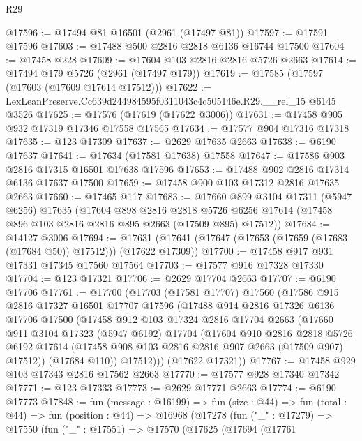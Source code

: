 \begin{lexlean}{R29}
\begin{coremodule}
@17596 := @17494 @81 @16501 (@2961 (@17497 @81))
@17597 := @17591 @17596
@17603 := @17488 @500 @2816 @2818 @6136 @16744 @17500
@17604 := @17458 @228
@17609 := @17604 @103 @2816 @2816 @5726 @2663
@17614 := @17494 @179 @5726 (@2961 (@17497 @179))
@17619 := @17585 (@17597 (@17603 (@17609 @17614 @17512)))
@17622 := LexLeanPreserve.Cc639d244984595f0311043c4c505146e.R29.__rel_15 @6145 @3526
@17625 := @17576 (@17619 (@17622 @3006))
@17631 := @17458 @905 @932 @17319 @17346 @17558 @17565
@17634 := @17577 @904 @17316 @17318
@17635 := @123 @17309
@17637 := @2629 @17635 @2663
@17638 := @6190 @17637
@17641 := @17634 (@17581 @17638) @17558
@17647 := @17586 @903 @2816 @17315 @16501 @17638 @17596
@17653 := @17488 @902 @2816 @17314 @6136 @17637 @17500
@17659 := @17458 @900 @103 @17312 @2816 @17635 @2663
@17660 := @17465 @117
@17683 := @17660
    @899
    @3104
    @17311
    (@5947 @6256)
    @17635
    (@17604
      @898
      @2816
      @2818
      @5726
      @6256
      @17614
      (@17458 @896 @103 @2816 @2816 @895 @2663 (@17509 @895) @17512))
@17684 := @14127 @3006
@17694 := @17631 (@17641 (@17647 (@17653 (@17659 (@17683 (@17684 @50)) @17512))) (@17622 @17309))
@17700 := @17458 @917 @931 @17331 @17345 @17560 @17564
@17703 := @17577 @916 @17328 @17330
@17704 := @123 @17321
@17706 := @2629 @17704 @2663
@17707 := @6190 @17706
@17761 := @17700
    (@17703
      (@17581 @17707)
      @17560
      (@17586
        @915
        @2816
        @17327
        @16501
        @17707
        @17596
        (@17488
          @914
          @2816
          @17326
          @6136
          @17706
          @17500
          (@17458
            @912
            @103
            @17324
            @2816
            @17704
            @2663
            (@17660
              @911
              @3104
              @17323
              (@5947 @6192)
              @17704
              (@17604
                @910
                @2816
                @2818
                @5726
                @6192
                @17614
                (@17458 @908 @103 @2816 @2816 @907 @2663 (@17509 @907) @17512))
              (@17684 @110))
            @17512)))
      (@17622 @17321))
@17767 := @17458 @929 @103 @17343 @2816 @17562 @2663
@17770 := @17577 @928 @17340 @17342
@17771 := @123 @17333
@17773 := @2629 @17771 @2663
@17774 := @6190 @17773
@17848 := fun (message : @16199) =>
  fun (size : @44) =>
  fun (total : @44) =>
  fun (position : @44) =>
  @16968
    (@17278
      (fun ("_" : @17279) =>
      @17550
        (fun ("_" : @17551) =>
        @17570
          (@17625
            (@17694
              (@17761

\end{coremodule}
\end{lexlean}
